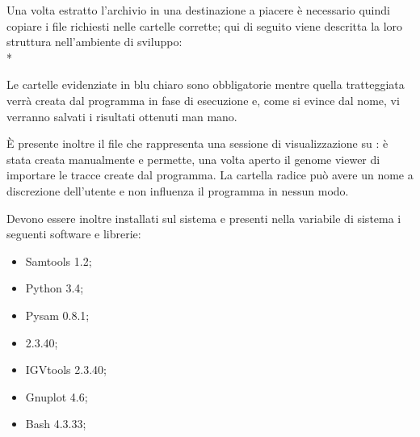 Una volta estratto l'archivio in una destinazione a piacere è necessario quindi copiare i file richiesti nelle cartelle corrette; qui di seguito viene descritta la loro struttura nell'ambiente di sviluppo:\\*



Le cartelle evidenziate in blu chiaro sono obbligatorie mentre quella tratteggiata verrà creata dal programma in fase di esecuzione e, come si evince dal nome, vi verranno salvati i risultati ottenuti man mano.

È presente inoltre il file  che rappresenta una sessione di visualizzazione su : è stata creata manualmente e permette, una volta aperto il genome viewer di importare le tracce create dal programma.
La cartella radice può avere un nome a discrezione dell'utente e non influenza il programma in nessun modo.

Devono essere inoltre installati sul sistema e presenti nella variabile di sistema  i seguenti software e librerie:
\begin{itemize}
\item Samtools 1.2;
\item Python 3.4;
\item Pysam 0.8.1;
\item {} 2.3.40;
\item IGVtools 2.3.40;
\item Gnuplot 4.6;
\item Bash 4.3.33;
\end{itemize}


